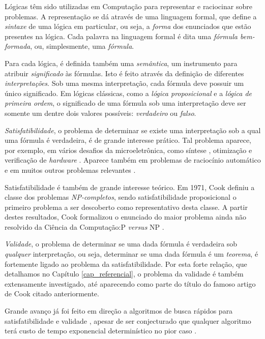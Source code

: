 \indent

Lógicas têm sido utilizadas em Computação para representar e raciocinar sobre problemas. A representação se dá através de uma linguagem formal, que define a \emph{sintaxe} de uma lógica em particular, ou seja, a \emph{forma} dos enunciados que estão presentes na lógica. Cada palavra na linguagem formal é dita uma \emph{fórmula bem-formada}, ou, simplesmente, uma \emph{fórmula}.

Para cada lógica, é definida também uma \emph{semântica}, um instrumento para atribuir \emph{significado} às fórmulas. Isto é feito através da definição de diferentes \emph{interpretações}. Sob uma mesma interpretação, cada fórmula deve possuir um único significado. Em lógicas clássicas, como a \emph{lógica proposicional} e a \emph{lógica de primeira ordem}, o significado de uma fórmula sob uma interpretação deve ser somente um dentre dois valores possíveis: \emph{verdadeiro} ou \emph{falso}.

\emph{Satisfatibilidade}, o problema de determinar se existe uma interpretação sob a qual uma fórmula é verdadeira, é de grande interesse prático. Tal problema aparece, por exemplo, em vários desafios da microeletrônica, como síntese \cite{bloem2014sat}, otimização \cite{nieuwenhuis2006sat} e verificação de \textit{hardware} \cite{gupta2006sat}. Aparece também em problemas de raciocínio automático \cite{harrison2009handbook} e em muitos outros problemas relevantes \cite{horvitz1992automated}.

Satisfatibilidade é também de grande interesse teórico. Em 1971, Cook definiu a classe dos problemas \emph{NP-completos}, sendo satisfatibilidade proposicional o primeiro problema a ser descoberto como representativo desta classe. A partir destes resultados, Cook formalizou o enunciado do maior problema ainda não resolvido da Ciência da Computação:\break P \emph{versus} NP \cite{cook1971complexity}.

\emph{Validade}, o problema de determinar se uma dada fórmula é verdadeira sob \emph{qualquer} interpretação, ou seja, determinar se uma dada fórmula é um \emph{teorema}, é fortemente ligado ao problema da satisfatibilidade. Por esta forte relação, que detalhamos no Capítulo \ref{cap_referencial}, o problema da validade é também extensamente investigado, até aparecendo como parte do título do famoso artigo de Cook citado anteriormente.

Grande avanço já foi feito em direção a algoritmos de busca rápidos para satisfatibilidade e validade \cite{davis1960computing,davis1962machine,biere2009conflict}, apesar de ser conjecturado que qualquer algoritmo terá custo de tempo exponencial determinístico no pior caso \cite{cook1971complexity}.

